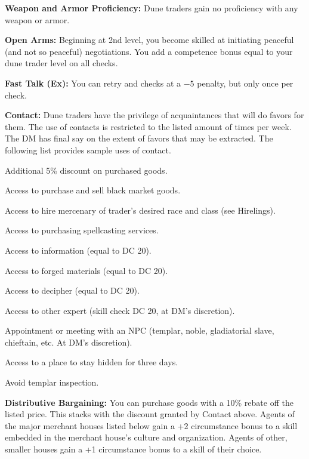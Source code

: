 {
\textbf{Weapon and Armor Proficiency:} Dune traders gain no proficiency with any weapon or armor.

\textbf{Open Arms:} Beginning at 2nd level, you become skilled at initiating peaceful (and not so peaceful) negotiations. You add a competence bonus equal to \onehalf your dune trader level on all  checks.

\textbf{Fast Talk (Ex):} You can retry  and  checks at a $-5$ penalty, but only once per check.

\textbf{Contact:} Dune traders have the privilege of acquaintances that will do favors for them. The use of contacts is restricted to the listed amount of times per week. The DM has final say on the extent of favors that may be extracted. The following list provides sample uses of contact.

\begin{itemize*}
\item Additional 5\% discount on purchased goods.
\item Access to purchase and sell black market goods.
\item Access to hire mercenary of trader's desired race and class (see Hirelings).
\item Access to purchasing spellcasting services.
\item Access to information (equal to  DC 20).
\item Access to forged materials (equal to  DC 20).
\item Access to decipher (equal to  DC 20).
\item Access to other expert (skill check DC 20, at DM's discretion).
\item Appointment or meeting with an NPC (templar, noble, gladiatorial slave, chieftain, etc. At DM's discretion).
\item Access to a place to stay hidden for three days.
\item Avoid templar inspection.
\end{itemize*}

\textbf{Distributive Bargaining:} You can purchase goods with a 10\% rebate off the listed price. This stacks with the discount granted by Contact above. Agents of the major merchant houses listed below gain a +2 circumstance bonus to a skill embedded in the merchant house’s culture and organization. Agents of other, smaller houses gain a +1 circumstance bonus to a skill of their choice.

}
